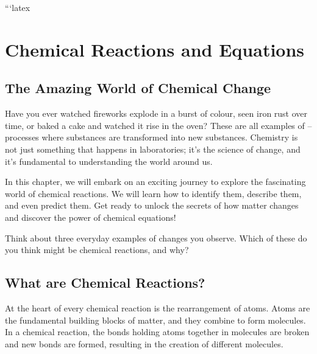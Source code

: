 ```latex
\chapter{Chemical Reactions and Equations}

\section{The Amazing World of Chemical Change}


Have you ever watched fireworks explode in a burst of colour, seen iron rust over time, or baked a cake and watched it rise in the oven? These are all examples of  – processes where substances are transformed into new substances. Chemistry is not just something that happens in laboratories; it's the science of change, and it's fundamental to understanding the world around us.

In this chapter, we will embark on an exciting journey to explore the fascinating world of chemical reactions. We will learn how to identify them, describe them, and even predict them. Get ready to unlock the secrets of how matter changes and discover the power of chemical equations!

\begin{stopandthink}
Think about three everyday examples of changes you observe. Which of these do you think might be chemical reactions, and why?
\end{stopandthink}

\section{What are Chemical Reactions?}


At the heart of every chemical reaction is the rearrangement of atoms. Atoms are the fundamental building blocks of matter, and they combine to form molecules. In a chemical reaction, the bonds holding atoms together in molecules are broken and new bonds are formed, resulting in the creation of different molecules.

